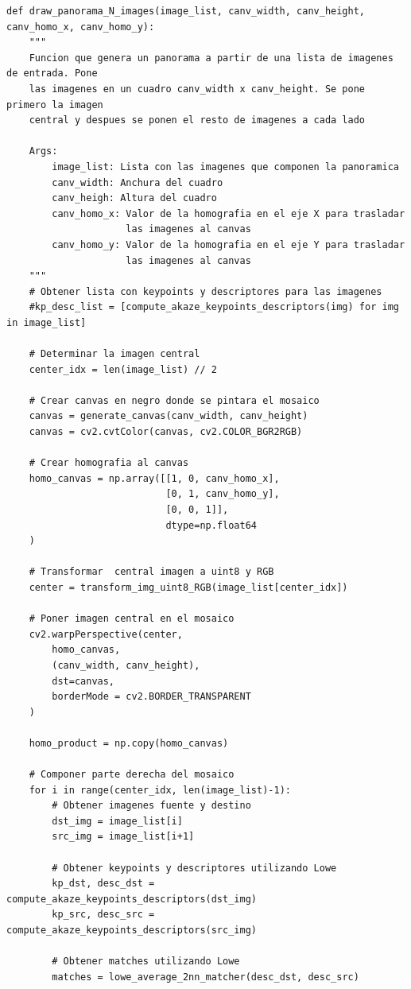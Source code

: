 \documentclass[11pt,a4paper]{article}
\begin{document}
\begin{lstlisting}
def draw_panorama_N_images(image_list, canv_width, canv_height, canv_homo_x, canv_homo_y):
    """
    Funcion que genera un panorama a partir de una lista de imagenes de entrada. Pone
    las imagenes en un cuadro canv_width x canv_height. Se pone primero la imagen
    central y despues se ponen el resto de imagenes a cada lado

    Args:
        image_list: Lista con las imagenes que componen la panoramica
        canv_width: Anchura del cuadro
        canv_heigh: Altura del cuadro
        canv_homo_x: Valor de la homografia en el eje X para trasladar
                     las imagenes al canvas
        canv_homo_y: Valor de la homografia en el eje Y para trasladar
                     las imagenes al canvas
    """
    # Obtener lista con keypoints y descriptores para las imagenes
    #kp_desc_list = [compute_akaze_keypoints_descriptors(img) for img in image_list]

    # Determinar la imagen central
    center_idx = len(image_list) // 2

    # Crear canvas en negro donde se pintara el mosaico
    canvas = generate_canvas(canv_width, canv_height)
    canvas = cv2.cvtColor(canvas, cv2.COLOR_BGR2RGB)

    # Crear homografia al canvas
    homo_canvas = np.array([[1, 0, canv_homo_x],
                            [0, 1, canv_homo_y],
                            [0, 0, 1]], 
                            dtype=np.float64
    )

    # Transformar  central imagen a uint8 y RGB
    center = transform_img_uint8_RGB(image_list[center_idx])

    # Poner imagen central en el mosaico
    cv2.warpPerspective(center,
        homo_canvas,
        (canv_width, canv_height),
        dst=canvas,
        borderMode = cv2.BORDER_TRANSPARENT
    )

    homo_product = np.copy(homo_canvas)

    # Componer parte derecha del mosaico
    for i in range(center_idx, len(image_list)-1):
        # Obtener imagenes fuente y destino
        dst_img = image_list[i]
        src_img = image_list[i+1]
 
        # Obtener keypoints y descriptores utilizando Lowe
        kp_dst, desc_dst = compute_akaze_keypoints_descriptors(dst_img)
        kp_src, desc_src = compute_akaze_keypoints_descriptors(src_img)

        # Obtener matches utilizando Lowe
        matches = lowe_average_2nn_matcher(desc_dst, desc_src)


\end{lstlisting}
\end{document}
